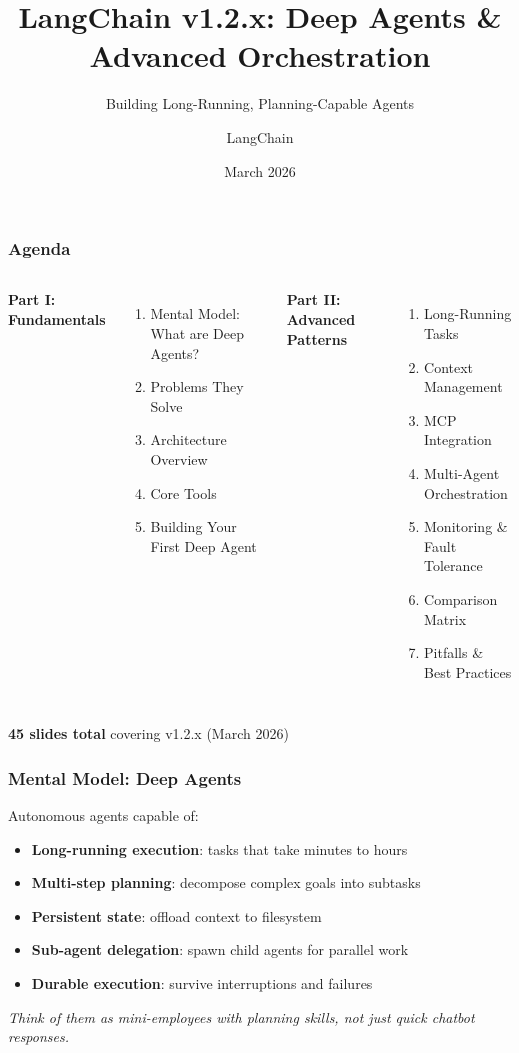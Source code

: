 \documentclass[aspectratio=169,11pt]{beamer}
\title{LangChain v1.2.x: Deep Agents \& Advanced Orchestration}
\subtitle{Building Long-Running, Planning-Capable Agents}
\author{LangChain}
\date{March 2026}
\begin{document}
\frame{\titlepage}

\begin{frame}[fragile]
\frametitle{Agenda}
\begin{columns}[T]
\textbf{Part I: Fundamentals}
\begin{enumerate}
    \setlength{\itemsep}{1pt}
  \item Mental Model: What are Deep Agents?
  \item Problems They Solve
  \item Architecture Overview
  \item Core Tools
  \item Building Your First Deep Agent
\end{enumerate}

\textbf{Part II: Advanced Patterns}
\begin{enumerate}
    \setlength{\itemsep}{1pt}
  \item Long-Running Tasks
  \item Context Management
  \item MCP Integration
  \item Multi-Agent Orchestration
  \item Monitoring \& Fault Tolerance
  \item Comparison Matrix
  \item Pitfalls \& Best Practices
\end{enumerate}
\end{columns}
\vfill
\textcolor{lcblue}{\textbf{45 slides total}} covering v1.2.x (March 2026)
\end{frame}

\begin{frame}[fragile]
\frametitle{Mental Model: Deep Agents}

\begin{conceptbox}
Autonomous agents capable of:
\begin{itemize}
    \setlength{\itemsep}{1pt}
  \item \textbf{Long-running execution}: tasks that take minutes to hours
  \item \textbf{Multi-step planning}: decompose complex goals into subtasks
  \item \textbf{Persistent state}: offload context to filesystem
  \item \textbf{Sub-agent delegation}: spawn child agents for parallel work
  \item \textbf{Durable execution}: survive interruptions and failures
\end{itemize}
\end{conceptbox}

\vspace{1em}
\begin{center}
\textit{Think of them as mini-employees with planning skills, not just quick chatbot responses.}
\end{center}

\end{frame}
\end{document}

